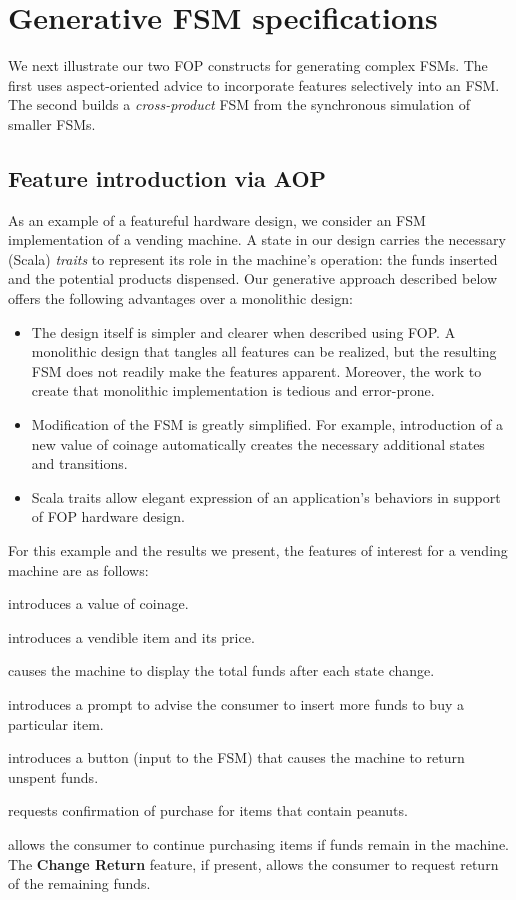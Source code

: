 \documentclass[conference]{IEEEtran}
\begin{document}
\section{Generative FSM specifications}

We next illustrate our two FOP constructs for generating complex FSMs.  The first uses aspect-oriented advice to incorporate features selectively into an FSM.  The second builds a \emph{cross-product} FSM from the synchronous simulation of smaller FSMs.

\subsection{Feature introduction via AOP}\label{sec:vend}

As an example of a featureful hardware design, we consider an FSM implementation of a vending machine.   A state in our design carries the necessary (Scala) \emph{traits} to represent its role in the machine's operation:  the funds inserted and the potential products dispensed.  Our generative approach described below offers the following advantages over a monolithic design:
\begin{itemize}
    \item The design itself is simpler and clearer when described using FOP.  A monolithic design that tangles all features can be realized, but the resulting FSM does not readily make the features apparent.  Moreover, the work to create that monolithic implementation is tedious and error-prone.
    \item Modification of the FSM is greatly simplified.  For example, introduction of a new value of coinage automatically creates the necessary additional states and transitions.
    \item Scala traits allow elegant expression of an application's behaviors in support of FOP hardware design.
\end{itemize}
For this example and the results we present, the features of interest for a vending machine are as follows:
\begin{description}
    \item[Add Currency] introduces a value of coinage.
    \item[Dispense Product] introduces a vendible item and its price.
    \item[Print Funds] causes the machine to display the total funds after each state change.
    \item[Insufficient Funds] introduces a prompt to advise the consumer to insert more funds to buy a particular item.
    \item[Change Return] introduces a button (input to the FSM) that causes the machine to return unspent funds.
    \item[Peanut Warning] requests confirmation of purchase for items that contain peanuts.
    \item[Buy More] allows the consumer to continue purchasing items if funds remain in the machine.  The \textbf{Change Return} feature, if present, allows the consumer to request return of the remaining funds.
\end{description}
\end{document}
